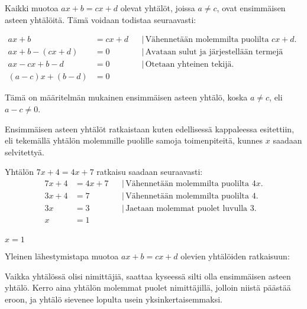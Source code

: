 Kaikki muotoa $ax+b=cx+d$ olevat yhtälöt, joissa $a \neq c$, ovat ensimmäisen asteen yhtälöitä. Tämä voidaan todistaa seuraavasti:

\begin{align*}
ax+b &= cx+d & &| \, \text{Vähennetään molemmilta puolilta $cx+d$}. \\
ax+b - (cx+d) &= 0 & &| \, \text{Avataan sulut ja järjestellään termejä uudelleen.} \\
ax - cx + b - d &= 0 & &| \, \text{Otetaan yhteinen tekijä.} \\
(a-c)x + (b-d) &= 0 & &
\end{align*}

Tämä on määritelmän mukainen ensimmäisen asteen yhtälö, koska $a \neq c$, eli $a-c \neq 0$.

Ensimmäisen asteen yhtälöt ratkaistaan kuten edellisessä kappaleessa esitettiin, eli tekemällä yhtälön molemmille puolille  samoja toimenpiteitä, kunnes $x$ saadaan selvitettyä. 

\begin{esimerkki}
Yhtälön $7x+4=4x+7$ ratkaisu saadaan seuraavasti:
\begin{align*}
7x+4 &= 4x+7 & &| \, \text{Vähennetään molemmilta puolilta $4x$.} \\
3x+4 &= 7 & &| \, \text{Vähennetään molemmilta puolilta 4.} \\
3x &= 3 & &| \, \text{Jaetaan molemmat puolet luvulla 3.} \\
x &= 1 & & \\
\end{align*}

	\begin{esimvast}
$x=1$
	\end{esimvast}
\end{esimerkki}


\begin{esimerkki}
Yleinen lähestymistapa muotoa $ax+b = cx+d$ olevien yhtälöiden ratkaisuun:
\end{esimerkki}

Vaikka yhtälössä olisi nimittäjiä, saattaa kyseessä silti olla ensimmäisen asteen yhtälö. Kerro aina yhtälön molemmat puolet nimittäjillä, jolloin niistä päästää eroon, ja yhtälö sievenee lopulta usein yksinkertaisemmaksi.

